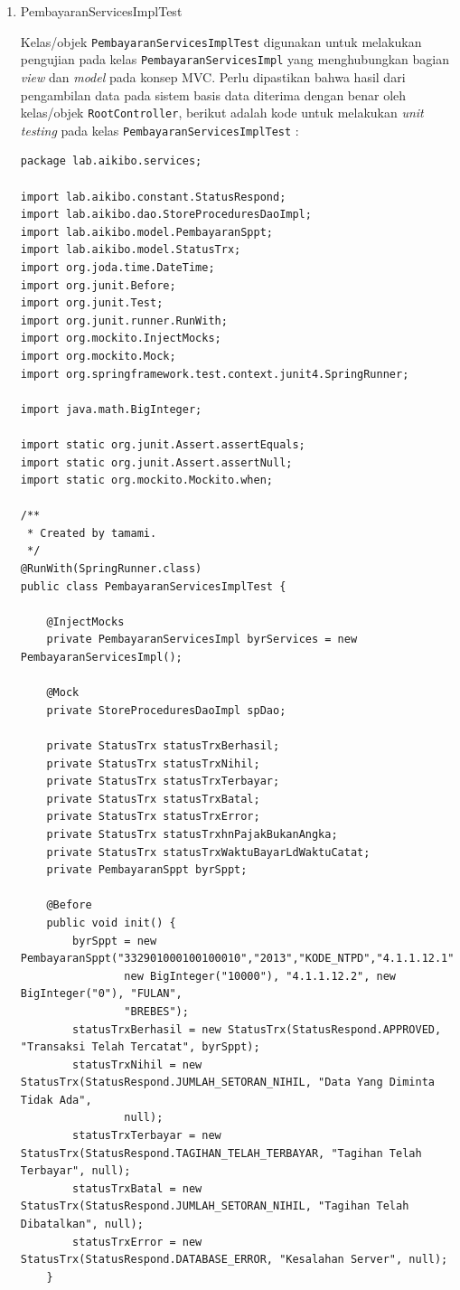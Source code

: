 \documentclass[pdftex,12pt, oneside]{article}
\begin{document}
\begin{enumerate}[A.]
\begin{enumerate}[1.]
    Dari gambar tersebut menunjukkan bahwa hasil pengujian yang dilakukan berhasil sesuai dengan apa yang diharapkan.
    
    \item PembayaranServicesImplTest
    
    Kelas/objek \texttt{PembayaranServicesImplTest} digunakan untuk melakukan pengujian pada kelas \texttt{PembayaranServicesImpl} yang menghubungkan bagian \textit{view} dan \textit{model} pada konsep MVC. Perlu dipastikan bahwa hasil dari pengambilan data pada sistem basis data diterima dengan benar oleh kelas/objek \texttt{RootController}, berikut adalah kode untuk melakukan \textit{unit testing} pada kelas \texttt{PembayaranServicesImplTest} :
    
    \begin{lstlisting}
package lab.aikibo.services;

import lab.aikibo.constant.StatusRespond;
import lab.aikibo.dao.StoreProceduresDaoImpl;
import lab.aikibo.model.PembayaranSppt;
import lab.aikibo.model.StatusTrx;
import org.joda.time.DateTime;
import org.junit.Before;
import org.junit.Test;
import org.junit.runner.RunWith;
import org.mockito.InjectMocks;
import org.mockito.Mock;
import org.springframework.test.context.junit4.SpringRunner;

import java.math.BigInteger;

import static org.junit.Assert.assertEquals;
import static org.junit.Assert.assertNull;
import static org.mockito.Mockito.when;

/**
 * Created by tamami.
 */
@RunWith(SpringRunner.class)
public class PembayaranServicesImplTest {

    @InjectMocks
    private PembayaranServicesImpl byrServices = new PembayaranServicesImpl();

    @Mock
    private StoreProceduresDaoImpl spDao;

    private StatusTrx statusTrxBerhasil;
    private StatusTrx statusTrxNihil;
    private StatusTrx statusTrxTerbayar;
    private StatusTrx statusTrxBatal;
    private StatusTrx statusTrxError;
    private StatusTrx statusTrxhnPajakBukanAngka;
    private StatusTrx statusTrxWaktuBayarLdWaktuCatat;
    private PembayaranSppt byrSppt;

    @Before
    public void init() {
        byrSppt = new PembayaranSppt("332901000100100010","2013","KODE_NTPD","4.1.1.12.1",
                new BigInteger("10000"), "4.1.1.12.2", new BigInteger("0"), "FULAN",
                "BREBES");
        statusTrxBerhasil = new StatusTrx(StatusRespond.APPROVED, "Transaksi Telah Tercatat", byrSppt);
        statusTrxNihil = new StatusTrx(StatusRespond.JUMLAH_SETORAN_NIHIL, "Data Yang Diminta Tidak Ada",
                null);
        statusTrxTerbayar = new StatusTrx(StatusRespond.TAGIHAN_TELAH_TERBAYAR, "Tagihan Telah Terbayar", null);
        statusTrxBatal = new StatusTrx(StatusRespond.JUMLAH_SETORAN_NIHIL, "Tagihan Telah Dibatalkan", null);
        statusTrxError = new StatusTrx(StatusRespond.DATABASE_ERROR, "Kesalahan Server", null);
    }


\end{lstlisting}
\end{enumerate}
\end{enumerate}
\end{document}
